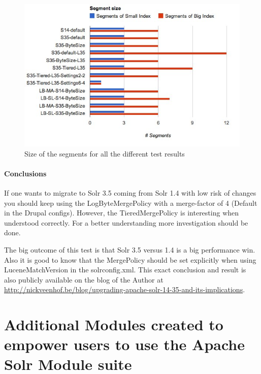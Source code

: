\begin{figure}
     \includegraphics[width=\textwidth]{images/implementation/segments_0.jpg}
     \caption{Size of the segments for all the different test results}
\end{figure}

\paragraph{Conclusions}
If one wants to migrate to Solr 3.5 coming from Solr 1.4 with low risk of changes you should keep using the LogByteMergePolicy with a merge-factor of 4 (Default in the Drupal configs). 
However, the TieredMergePolicy is interesting when understood correctly. For a better understanding more investigation should be done. 

The big outcome of this test is that Solr 3.5 versus 1.4 is a big performance win. Also it is good to know that the MergePolicy should be set explicitly when using LuceneMatchVersion in the solrconfig.xml. This exact conclusion and result is also publicly available on the blog of the Author at \url{http://nickveenhof.be/blog/upgrading-apache-solr-14-35-and-its-implications}.
\clearpage

\section{Additional Modules created to empower users to use the Apache Solr Module suite}

